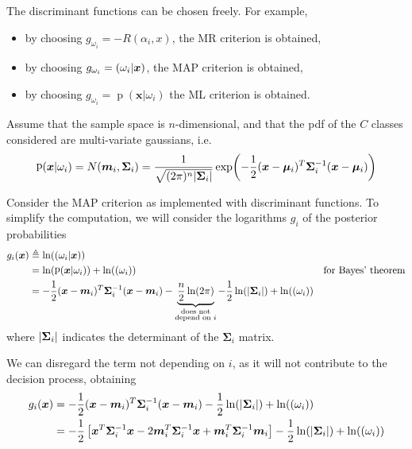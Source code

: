 \documentclass[oneside,onecolumn]{report}
\DeclareMathOperator*{\pdf}{p}
\let\P\relax
\DeclareMathOperator*{\P}{P}
\begin{document}
The discriminant functions can be chosen freely.
For example,
\begin{itemize}
    \item by choosing $g_{\omega_i} = -R(\alpha_i, x)$, the MR criterion is obtained,
    \item by choosing $g_{\omega_i} = \P(\omega_i | \bm x)$, the MAP criterion is obtained,
    \item by choosing $g_{\omega_i} = \pdf(\bm x | \omega_i)$ the ML criterion is obtained.
\end{itemize}

Assume that the sample space is $n$-dimensional, and that the pdf of the $C$ classes considered are multi-variate gaussians, i.e.
$$ \pdf(\bm x | \omega_i) = N(\bm m_i, \bm \Sigma_i) = \frac{1}{\sqrt{(2 \pi)^n \abs{\bm \Sigma_i}}} \exp(-\frac{1}{2} (\bm x - \bm \mu_i)^T \bm \Sigma_i^{-1} (\bm x - \bm \mu_i)) $$

Consider the MAP criterion as implemented with discriminant functions.
To simplify the computation, we will consider the logarithms $g_i$ of the posterior probabilities
\begin{align*}
    g_i(\bm x)
    &\triangleq \ln(\P(\omega_i | \bm x)) \\
    &= \ln(\pdf(\bm x | \omega_i)) + \ln(\P(\omega_i)) & \text{for Bayes' theorem} \\
    &= -\frac{1}{2} (\bm x - \bm m_i)^T \bm \Sigma_i^{-1} (\bm x - \bm m_i) - \underbrace{\frac{n}{2} \ln(2 \pi)}_{\substack{\text{does not} \\ \text{depend on } i}} - \frac{1}{2} \ln(\abs{\bm \Sigma_i}) + \ln(\P(\omega_i))
\end{align*}
where $\abs{\bm \Sigma_i}$ indicates the determinant of the $\bm \Sigma_i$ matrix.

We can disregard the term not depending on $i$, as it will not contribute to the decision process, obtaining
\begin{align*}
    g_i(\bm x)
    &= -\frac{1}{2} (\bm x - \bm m_i)^T \bm \Sigma_i^{-1} (\bm x - \bm m_i) - \frac{1}{2} \ln(\abs{\bm \Sigma_i}) + \ln(\P(\omega_i)) \\
    &= -\frac{1}{2} \left[ \bm x^T \bm \Sigma_i^{-1} \bm x - 2 \bm m_i^T \bm \Sigma_i^{-1} \bm x + \bm m_i^T \bm \Sigma_i^{-1} \bm m_i \right] - \frac{1}{2} \ln(\abs{\bm \Sigma_i}) + \ln(\P(\omega_i))
\end{align*}
\end{document}
